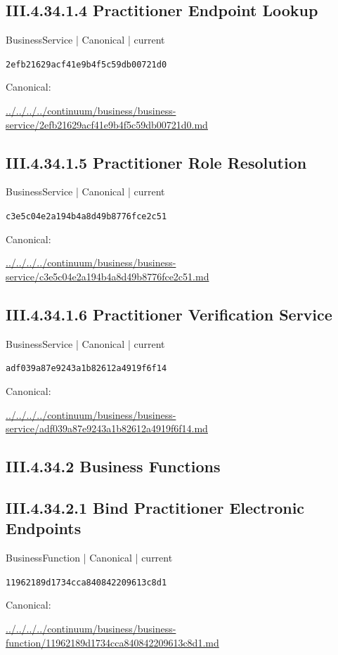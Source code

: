 \documentclass[10pt,a4paper]{article}
\begin{document}
\subsection*{III.4.34.1.4 Practitioner Endpoint Lookup}
{\small BusinessService | Canonical | current}\par
\texttt{2efb21629acf41e9b4f5c59db00721d0}\par
Canonical: \par
{\footnotesize\url{../../../../continuum/business/business-service/2efb21629acf41e9b4f5c59db00721d0.md}}\par
\subsection*{III.4.34.1.5 Practitioner Role Resolution}
{\small BusinessService | Canonical | current}\par
\texttt{c3e5c04e2a194b4a8d49b8776fce2c51}\par
Canonical: \par
{\footnotesize\url{../../../../continuum/business/business-service/c3e5c04e2a194b4a8d49b8776fce2c51.md}}\par
\subsection*{III.4.34.1.6 Practitioner Verification Service}
{\small BusinessService | Canonical | current}\par
\texttt{adf039a87e9243a1b82612a4919f6f14}\par
Canonical: \par
{\footnotesize\url{../../../../continuum/business/business-service/adf039a87e9243a1b82612a4919f6f14.md}}\par
\subsection*{III.4.34.2 Business Functions}
\subsection*{III.4.34.2.1 Bind Practitioner Electronic Endpoints}
{\small BusinessFunction | Canonical | current}\par
\texttt{11962189d1734cca840842209613c8d1}\par
Canonical: \par
{\footnotesize\url{../../../../continuum/business/business-function/11962189d1734cca840842209613c8d1.md}}\par
\end{document}
